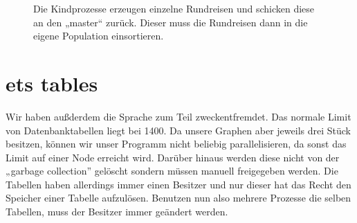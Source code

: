 \begin{SCfigure}
  \caption[Verteilte Erzeugung von Offsprings]
  {\label{fig:topology-central} Die Kindprozesse erzeugen einzelne
    Rundreisen und schicken diese an den „master“ zurück.  Dieser muss
    die Rundreisen dann in die eigene Population einsortieren.}
\end{SCfigure}

\section{ets tables}
\label{sec:ets}

Wir haben außderdem die Sprache zum Teil zweckentfremdet.  Das normale
Limit von Datenbanktabellen liegt bei 1400.  Da unsere Graphen aber
jeweils drei Stück besitzen, können wir unser Programm nicht beliebig
parallelisieren, da sonst das Limit auf einer Node erreicht wird.
Darüber hinaus werden diese nicht von der „garbage collection”
gelöscht sondern müssen manuell freigegeben werden.  Die Tabellen
haben allerdings immer einen Besitzer und nur dieser hat das Recht den
Speicher einer Tabelle aufzulösen.  Benutzen nun also mehrere Prozesse
die selben Tabellen, muss der Besitzer immer geändert werden.

